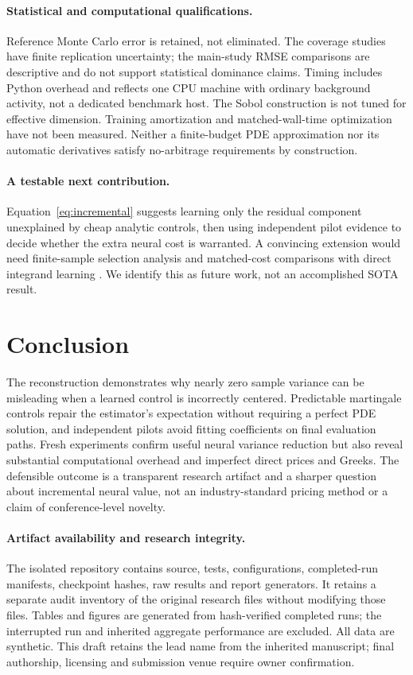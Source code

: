 \documentclass[10pt]{article}
\newcommand{\citep}[1]{\cite{#1}}
\begin{document}
\paragraph{Statistical and computational qualifications.}
Reference Monte Carlo error is retained, not eliminated. The coverage studies
have finite replication uncertainty; the main-study RMSE comparisons are
descriptive and do not support statistical dominance claims. Timing includes
Python overhead and reflects one CPU machine with ordinary background activity,
not a dedicated benchmark host. The Sobol construction is not tuned for effective
dimension. Training amortization and matched-wall-time optimization have not
been measured. Neither a finite-budget PDE approximation nor its automatic
derivatives satisfy no-arbitrage requirements by construction.

\paragraph{A testable next contribution.}
Equation~\eqref{eq:incremental} suggests learning only the residual component
unexplained by cheap analytic controls, then using independent pilot evidence
to decide whether the extra neural cost is warranted. A convincing extension
would need finite-sample selection analysis and matched-cost comparisons with
direct integrand learning \citep{vidales2022,hinds2023}. We identify this as
future work, not an accomplished SOTA result.

\section{Conclusion}
The reconstruction demonstrates why nearly zero sample variance can be
misleading when a learned control is incorrectly centered. Predictable
martingale controls repair the estimator's expectation without requiring a
perfect PDE solution, and independent pilots avoid fitting coefficients on
final evaluation paths. Fresh experiments confirm useful neural variance
reduction but also reveal substantial computational overhead and imperfect
direct prices and Greeks. The defensible outcome is a transparent research
artifact and a sharper question about incremental neural value, not an
industry-standard pricing method or a claim of conference-level novelty.

\paragraph{Artifact availability and research integrity.}
The isolated repository contains source, tests, configurations, completed-run
manifests, checkpoint hashes, raw results and report generators. It retains a
separate audit inventory of the original research files without modifying those
files. Tables and figures are generated from hash-verified completed runs; the
interrupted run and inherited aggregate performance are excluded. All data are
synthetic. This draft retains the lead name from the inherited manuscript;
final authorship, licensing and submission venue require owner confirmation.



\end{document}
